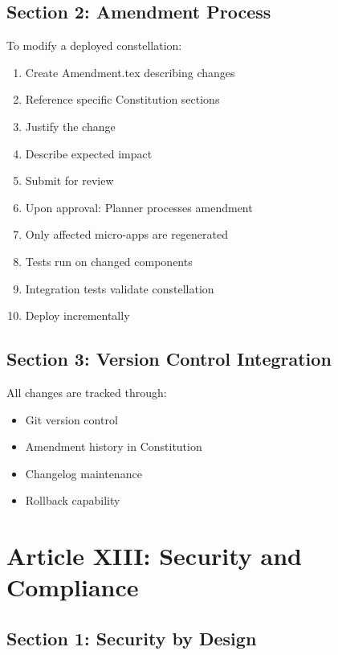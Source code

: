 \documentclass[12pt,letterpaper]{article}
\begin{document}
\subsection{Section 2: Amendment Process}

To modify a deployed constellation:

\begin{enumerate}
    \item Create Amendment.tex describing changes
    \item Reference specific Constitution sections
    \item Justify the change
    \item Describe expected impact
    \item Submit for review
    \item Upon approval: Planner processes amendment
    \item Only affected micro-apps are regenerated
    \item Tests run on changed components
    \item Integration tests validate constellation
    \item Deploy incrementally
\end{enumerate}

\subsection{Section 3: Version Control Integration}

All changes are tracked through:

\begin{itemize}
    \item Git version control
    \item Amendment history in Constitution
    \item Changelog maintenance
    \item Rollback capability
\end{itemize}

\section{Article XIII: Security and Compliance}

\subsection{Section 1: Security by Design}
\end{document}
